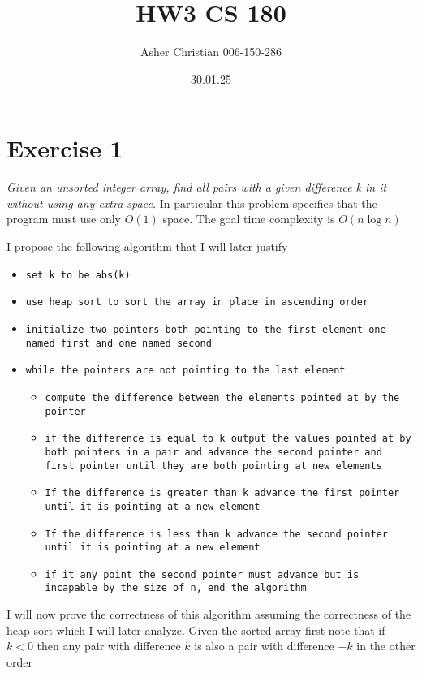 \documentclass{amsart}
\title{HW3 CS 180}
\author{Asher Christian 006-150-286}
\date{ 30.01.25}
\begin{document}
\maketitle


\section{Exercise 1}
\emph{
    Given an unsorted integer array, find all pairs with a given difference k in it without using any extra space.
}
In particular this problem specifies that the program must use only $O(1)$ space. The goal time complexity is $O(n\log n)$

I propose the following algorithm that I will later justify
{\small
    \begin{itemize}
        \item \texttt{set k to be abs(k)}
        \item \texttt{use heap sort to sort the array in place in ascending order}
        \item \texttt{initialize two pointers both pointing to the first element one named first and one named second}
        \item \texttt{while the pointers are not pointing to the last element}
            \begin{itemize}
                \item \texttt{compute the difference between the elements pointed at by the pointer}
                \item \texttt{if the difference is equal to k output the values pointed at by both pointers in a pair and advance the second pointer and first pointer until they are both
                    pointing at new elements}
                \item \texttt{If the difference is greater than k advance the first pointer until it is pointing at a new element}
                \item \texttt{If the difference is less than k advance the second pointer until it is pointing at a new element}
                \item \texttt{if it any point the second pointer must advance but is incapable by the size of n, end the algorithm}
            \end{itemize}
    \end{itemize}
}
I will now prove the correctness of this algorithm assuming the correctness of the heap sort which I will later analyze.
Given the sorted array first note that if $k < 0$ then any pair with difference $k$ is also a pair with difference $-k$ in the other order
\end{document}
